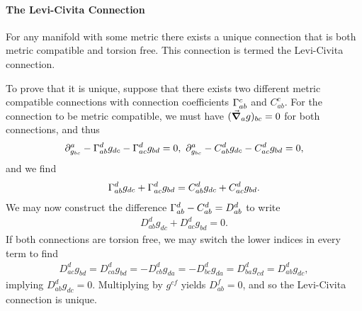 \paragraph{The Levi-Civita Connection}
For any manifold with some metric there exists a unique connection that is both metric compatible and torsion free. This connection is termed the Levi-Civita connection.

To prove that it is unique, suppose that there exists two different metric compatible connections with connection coefficients $\chris{c}{a}{b}$ and $C^{c}_{ab}$. For the connection to be metric compatible, we must have $(\grad_{a}{g})_{bc} = 0$ for both connections, and thus
\begin{align*}
	\del{a}{g_{bc}} - \chris{d}{a}{b}g_{dc} - \chris{d}{a}{c}g_{bd} = 0,\ \del{a}{g_{bc}} - C^{d}_{ab}g_{dc} - C^{d}_{ac}g_{bd} = 0,
\end{align*}
and we find
\begin{align*}
	\chris{d}{a}{b}g_{dc} + \chris{d}{a}{c}g_{bd} = C^{d}_{ab}g_{dc} + C^{d}_{ac}g_{bd}.
\end{align*}
We may now construct the difference $\chris{d}{a}{b} - C^{d}_{ab} = D^{d}_{ab}$ to write
\begin{align*}
	D^{d}_{ab}g_{dc} + D^{d}_{ac}g_{bd} = 0.
\end{align*}
If both connections are torsion free, we may switch the lower indices in every term to find
\begin{align*}
	D^{d}_{ac}g_{bd} = D^{d}_{ca}g_{bd} = -D^{d}_{cb}g_{da} = -D^{d}_{bc}g_{da} = D^{d}_{ba}g_{cd} = D^{d}_{ab}g_{dc},
\end{align*}
implying $D^{d}_{ab}g_{dc} = 0$. Multiplying by $g^{cf}$ yields $D^{f}_{ab} = 0$, and so the Levi-Civita connection is unique.

